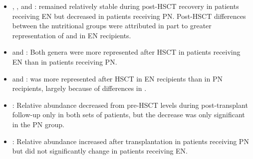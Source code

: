 \documentclass[11pt,a4paper]{article}
\begin{document}
\begin{itemize}

\item \taxLachnospiraceae, \taxBlautia, and \taxDorea: \taxLachnospiraceae remained relatively stable during post-HSCT recovery in patients receiving EN but decreased in patients receiving PN. Post-HSCT differences between the nutritional groups were attributed in part to greater representation of \taxBlautia and \taxDorea in EN recipients.

\item \taxParabacteroides and \taxOscillospira: Both genera were more represented after HSCT in patients receiving EN than in patients receiving PN.

\item \taxBacteroidaceae and \taxBacteroides: \taxBacteroidaceae was more represented after HSCT in EN recipients than in PN recipients, largely because of differences in \taxBacteroides.

\item \taxFaecalibacterium: Relative abundance decreased from pre-HSCT levels during post-transplant follow-up only in both sets of patients, but the decrease was only significant in the PN group.

\item \taxStreptococcus: Relative abundance increased after transplantation in patients receiving PN but did not significantly change in patients receiving EN.


\end{itemize}
\end{document}

